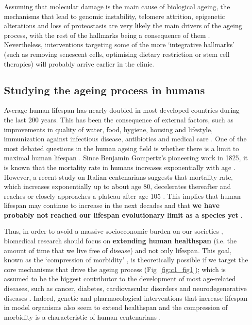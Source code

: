\bigskip

Assuming that molecular damage is the main cause of biological ageing, the mechanisms that lead to genomic instability, telomere attrition, epigenetic alterations and loss of proteostasis are very likely the main drivers of the ageing process, with the rest of the hallmarks being a consequence of them \cite{Lopez-Otin2013}. Nevertheless, interventions targeting some of the more `integrative hallmarks' (such as removing senescent cells, optimising dietary restriction or stem cell therapies) will probably arrive earlier in the clinic.

\smallskip

\subsection{Studying the ageing process in humans}

\smallskip

Average human lifespan has nearly doubled in most developed countries during the last 200 years. This has been the consequence of external factors, such as improvements in quality of water, food, hygiene, housing and lifestyle, immunization against infectious disease, antibiotics and medical care \cite{Partridge2018}. One of the most debated questions in the human ageing field is whether there is a limit to maximal human lifespan \cite{Dong2016}. Since Benjamin Gompertz's pioneering work in 1825, it is known that the mortality rate in humans increases exponentially with age \cite{Gompertz1825}. However, a recent study on Italian centenarians suggests that mortality rate, which increases exponentially up to about age 80, decelerates thereafter and reaches or closely approaches a plateau after age 105 \cite{Barbi2018}. This implies that human lifespan may continue to increase in the next decades and that \textbf{we have probably not reached our lifespan evolutionary limit as a species yet} \cite{Barbi2018,Kontis2017}. 

\bigskip

Thus, in order to avoid a massive socioeconomic burden on our societies \cite{Fine2014}, biomedical research should focus on \textbf{extending human healthspan} (i.e. the amount of time that we live free of disease) and not only lifespan. This goal, known as the `compression of morbidity' \cite{Partridge2018}, is theoretically possible if we target the core mechanisms that drive the ageing process (Fig~\ref{fig:c1_fig1}); which is assumed to be the biggest contributor to the development of most age-related diseases, such as cancer, diabetes, cardiovascular disorders and neurodegenerative diseases \cite{Lopez-Otin2013}. Indeed, genetic and pharmacological interventions that increase lifespan in model organisms also seem to extend healthspan \cite{NewellStamper2018} and the compression of morbidity is a characteristic of human centenarians \cite{Feldman2012}.  

